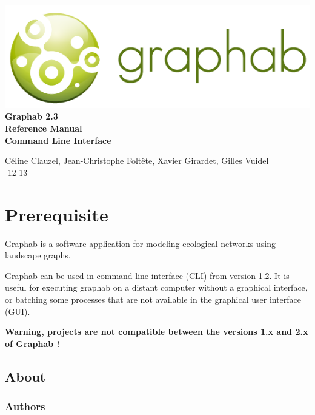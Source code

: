 \documentclass[a4paper,10pt]{report}
\begin{document}
\begin{titlepage}
	
	\centering
	\includegraphics[scale=0.5]{img/logo.png}\\
	
	\bigskip
	\bigskip
	\bigskip	
	{\Huge
		\bfseries
		Graphab 2.3\\
		\bigskip
		Reference Manual\\
		Command Line Interface\\
	}
	\bigskip
	\bigskip
	\bigskip
	\bigskip
	\bigskip
	
	{\Large		
		Céline Clauzel, Jean-Christophe Foltête, Xavier Girardet, Gilles Vuidel\\
		-12-13\\
	}
	
\end{titlepage}

\tableofcontents

\chapter{Prerequisite}
Graphab is a software application for modeling ecological networks using landscape graphs.

Graphab can be used in command line interface (CLI) from version 1.2.
It is useful for executing graphab on a distant computer without a graphical interface, or batching some processes that are not available in the graphical user interface (GUI).

\textbf{Warning, projects are not compatible between the versions 1.x and 2.x of Graphab !}

\section{About}

\subsection{Authors}
\end{document}
